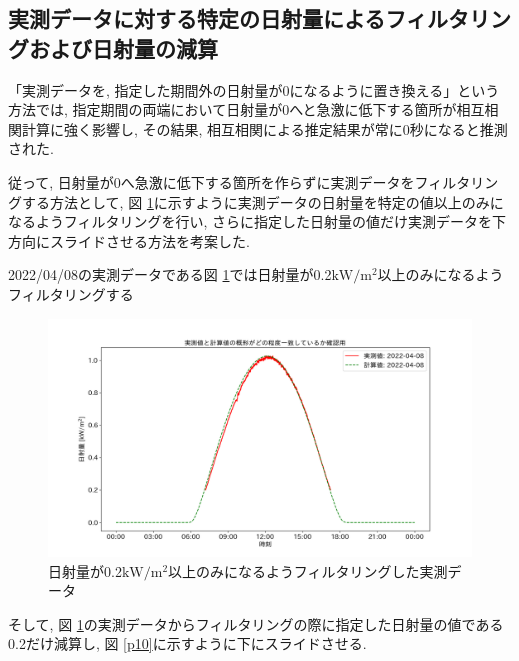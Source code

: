 \documentclass[a4j,12pt,]{jarticle}
\begin{document}
\subsection{実測データに対する特定の日射量によるフィルタリングおよび日射量の減算}
「実測データを, 指定した期間外の日射量が0になるように置き換える」という方法では, 指定期間の両端において日射量が0へと急激に低下する箇所が相互相関計算に強く影響し, その結果, 相互相関による推定結果が常に0秒になると推測された. 

従って, 日射量が0へ急激に低下する箇所を作らずに実測データをフィルタリングする方法として, 図 \ref{p9}に示すように実測データの日射量を特定の値以上のみになるようフィルタリングを行い, さらに指定した日射量の値だけ実測データを下方向にスライドさせる方法を考案した. 

2022/04/08の実測データである図 \ref{p9}では日射量が0.2$\mathrm{kW}/\mathrm{m}^2$以上のみになるようフィルタリングする

\begin{figure}[H]
  \begin{center}
    \includegraphics[width=160mm]{2022-04-08_mask_by_q_plot.png}
    \caption{日射量が0.2$\mathrm{kW}/\mathrm{m}^2$以上のみになるようフィルタリングした実測データ}
    \label{p9}
  \end{center}
\end{figure}

そして, 図 \ref{p9}の実測データからフィルタリングの際に指定した日射量の値である0.2だけ減算し, 図 \ref{p10}に示すように下にスライドさせる. 
\end{document}
